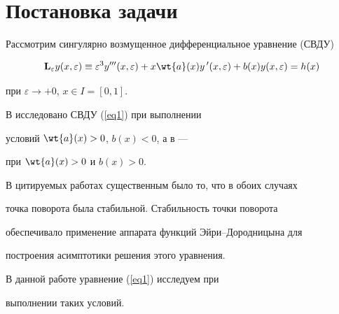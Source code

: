 

\maketitle


\label{begin}











\section{Постановка задачи}





Рассмотрим сингулярно возмущенное дифференциальное уравнение (СВДУ)


\begin{equation}\label{eq1}


\bold{L}_{\varepsilon} y (x, \varepsilon) \equiv \varepsilon^3


y''' (x, \varepsilon) + x \wt{a} (x) y \,' (x,


\varepsilon) + b(x) y(x, \varepsilon) = h (x)


\end{equation}


при $\varepsilon \rightarrow + 0$, $x \in I = [0,1]$.





В \cite{Bobochko1} исследовано СВДУ (\ref{eq1}) при выполнении


условий $ \wt{a}(x) > 0$, $b (x) < 0$, а в \cite{Bobochko2} ---


при $ \wt{a}(x) > 0$ и $ b (x) > 0$.


В цитируемых работах существенным было то, что в обоих случаях


точка поворота была стабильной. Стабильность точки поворота


обеспечивало применение аппарата функций Эйри--Дородницына для


построения асимптотики решения этого уравнения.





В данной работе уравнение (\ref{eq1}) исследуем при


выполнении таких условий.





